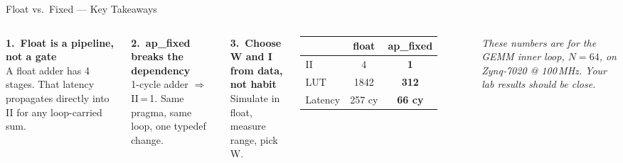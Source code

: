 \documentclass[aspectratio=169,12pt]{beamer}
\begin{document}
\begin{frame}{Float vs.\ Fixed --- Key Takeaways}
\vspace{0.15cm}
\begin{columns}[T,totalwidth=\textwidth]

  \colorbox{Navy!8}{\parbox{\dimexpr\linewidth-2\fboxsep\relax}{\vspace{4pt}
    \textbf{\color{Navy}1.\ Float is a pipeline, not a gate}\\[2pt]
    {\small A float adder has 4 stages. That latency
    propagates directly into II for any loop-carried sum.}
  \vspace{4pt}}}
  \vspace{6pt}

  \colorbox{Teal!10}{\parbox{\dimexpr\linewidth-2\fboxsep\relax}{\vspace{4pt}
    \textbf{\color{Teal}2.\ ap\_fixed breaks the dependency}\\[2pt]
    {\small 1-cycle adder $\Rightarrow$ II\,=\,1.
    Same pragma, same loop, one typedef change.}
  \vspace{4pt}}}
  \vspace{6pt}

  \colorbox{Orange!10}{\parbox{\dimexpr\linewidth-2\fboxsep\relax}{\vspace{4pt}
    \textbf{\color{Orange}3.\ Choose W and I from data, not habit}\\[2pt]
    {\small Simulate in float, measure range, pick W.}
  \vspace{4pt}}}

  \vspace{0.2cm}

  \begin{tabular}{lcc}
    \hline
    \rowcolor{Navy!10} & \textbf{float} & \textbf{ap\_fixed}\\
    \hline
    II      & 4 & \textbf{\color{GreenHi}1}\\
    \rowcolor{Navy!5}LUT     & 1842 & \textbf{\color{GreenHi}312}\\
    Latency & 257 cy & \textbf{\color{GreenHi}66 cy}\\
    \hline
  \end{tabular}

  \vspace{10pt}
  {\small\color{MidGray}\itshape These numbers are for the GEMM inner
  loop, $N=64$, on Zynq-7020 @ 100\,MHz.
  Your lab results should be close.}

\end{columns}
\end{frame}
\end{document}
